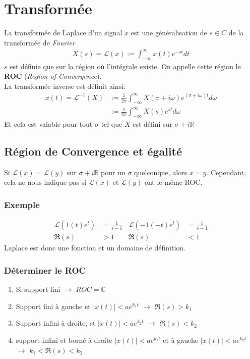 \documentclass{report}
\begin{document}
\section{Transformée}
La transformée de Laplace d'un signal $x$ est une généralisation de $s \in C$ de la transformée de \textit{Fourier}
\begin{align*}
X(s) = \mathcal{L}(x) := \int_{-\infty}^{\infty} x(t) e^{- s t} dt 
\end{align*}
$s$ est définie que sur la région où l'intégrale existe. On appelle cette région le \textbf{ROC} (\textit{Region of Convergence}).\\
La transformée inverse est définit ainsi:
\begin{align*}
x(t) = \mathcal{L}^{-1}(X) &:= \frac{1}{2 \pi} \int_{-\infty}^{\infty} X( \sigma + i \omega ) e^{(\sigma + i \omega)t } d \omega\\
&:= \frac{1}{2\pi} \int_{- \infty}^{\infty} X(s) e^{st} d\omega
\end{align*}
Et cela est valable pour tout $\sigma$ tel que $X$ est défini sur $\sigma + i \mathbb{R}$

\subsection{Région de Convergence et égalité}
Si $\mathcal{L}(x) = \mathcal{L}(y)$ sur $\sigma + i \mathbb{R}$ pour un $\sigma$ quelconque, alors $x=y$. Cependant, cela ne nous indique pas si $\mathcal{L}(x)$ et $\mathcal{L}(y)$ ont le même ROC.
\subsubsection{Exemple}
\begin{align*}
\mathcal{L}(1(t) e^t) &= \frac{1}{s-1} & \mathcal{L}(-1(-t) e^t) &= \frac{1}{s-1}\\
\mathfrak{R}(s) &> 1 & \mathfrak{R}(s) &< 1 
\end{align*}
Laplace est donc une fonction et un domaine de définition.

\subsubsection{Déterminer le ROC}
\begin{enumerate}
\item Si support fini $\rightarrow$ $ROC = \mathbb{C}$
\item Support fini à gauche et $|x(t)| < a e^{k_1 t}$ $\rightarrow$ $\mathfrak{R}(s) > k_1$
\item Support infini à droite, et $|x(t)| < a e^{k_2 t}$ $\rightarrow$ $\mathfrak{R}(s) < k_2$
\item support infini et borné à droite $|x(t)|< a e^{k_1 t}$ et à gauche $|x(t)| < a e^{k_2 t}$ $\rightarrow$ $k_1 < \mathfrak{R}(s) < k_2$
\end{enumerate}
\end{document}
